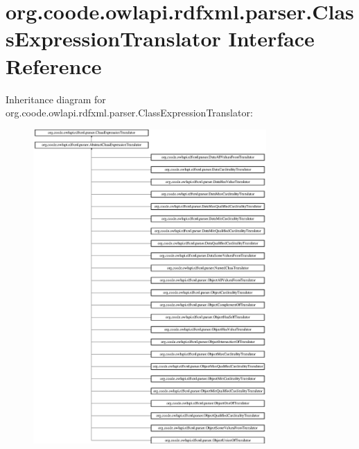 \hypertarget{interfaceorg_1_1coode_1_1owlapi_1_1rdfxml_1_1parser_1_1_class_expression_translator}{\section{org.\-coode.\-owlapi.\-rdfxml.\-parser.\-Class\-Expression\-Translator Interface Reference}
\label{interfaceorg_1_1coode_1_1owlapi_1_1rdfxml_1_1parser_1_1_class_expression_translator}
}
Inheritance diagram for org.\-coode.\-owlapi.\-rdfxml.\-parser.\-Class\-Expression\-Translator\-:\begin{figure}[H]
\begin{center}
\leavevmode
\includegraphics[height=12.000000cm]{interfaceorg_1_1coode_1_1owlapi_1_1rdfxml_1_1parser_1_1_class_expression_translator}
\end{center}
\end{figure}
